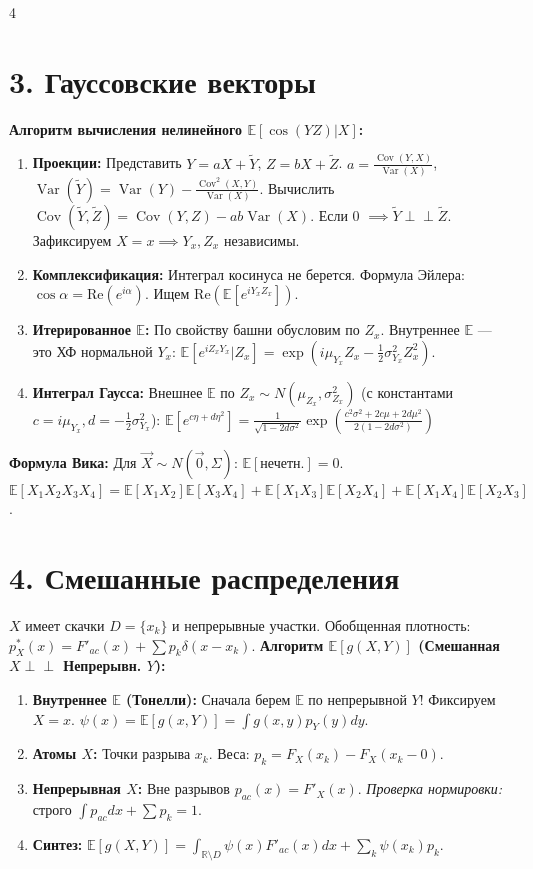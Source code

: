 \documentclass[8pt, a4paper, landscape]{extarticle}
\newcommand{\E}{\mathbb{E}}
\DeclareMathOperator{\Var}{Var}
\DeclareMathOperator{\Cov}{Cov}
\begin{document}
\begin{multicols*}{4}
\section*{3. Гауссовские векторы}
\textbf{Алгоритм вычисления нелинейного $\E[\cos(YZ)|X]$:}
\begin{enumerate}
    \item \textbf{Проекции:} Представить $Y = aX+\tilde{Y}$, $Z=bX+\tilde{Z}$.
    $a \!=\! \frac{\Cov(Y,X)}{\Var(X)}$, $\Var(\tilde{Y}) \!=\! \Var(Y) - \frac{\Cov^2(X,Y)}{\Var(X)}$.
    Вычислить $\Cov(\tilde{Y},\tilde{Z}) \!=\! \Cov(Y,Z) - ab\Var(X)$. Если 0 $\implies \tilde{Y} \perp\!\!\perp \tilde{Z}$. Зафиксируем $X=x \implies Y_x, Z_x$ независимы.
    \item \textbf{Комплексификация:} Интеграл косинуса не берется. Формула Эйлера: $\cos \alpha = \text{Re}(e^{i\alpha})$. Ищем $\text{Re}(\E[e^{iY_x Z_x}])$.
    \item \textbf{Итерированное $\E$:} По свойству башни обусловим по $Z_x$. Внутреннее $\E$ --- это ХФ нормальной $Y_x$:
    $\E[e^{i Z_x Y_x}|Z_x] = \exp(i\mu_{Y_x} Z_x - \frac{1}{2}\sigma_{Y_x}^2 Z_x^2)$.
    \item \textbf{Интеграл Гаусса:} Внешнее $\E$ по $Z_x \sim N(\mu_{Z_x}, \sigma_{Z_x}^2)$ (с константами $c=i\mu_{Y_x}, d=-\frac{1}{2}\sigma_{Y_x}^2$):
    $ \E[e^{c\eta + d\eta^2}] = \frac{1}{\sqrt{1-2d\sigma^2}}\exp\left( \frac{c^2\sigma^2+2c\mu+2d\mu^2}{2(1-2d\sigma^2)} \right) $
\end{enumerate}

\textbf{Формула Вика:} Для $\vec{X} \sim N(\vec{0}, \Sigma)$: $\E[\text{нечетн.}]=0$.
$\E[X_1 X_2 X_3 X_4] = \E[X_1 X_2]\E[X_3 X_4] + \E[X_1 X_3]\E[X_2 X_4] + \E[X_1 X_4]\E[X_2 X_3]$.

\section*{4. Смешанные распределения}
$X$ имеет скачки $D=\{x_k\}$ и непрерывные участки. Обобщенная плотность: $p_X^*(x) = F'_{ac}(x) + \sum p_k \delta(x-x_k)$.
\textbf{Алгоритм $\E[g(X,Y)]$ (Смешанная $X \perp\!\!\perp$ Непрерывн. $Y$):}
\begin{enumerate}
    \item \textbf{Внутреннее $\E$ (Тонелли):} Сначала берем $\E$ по непрерывной $Y$! Фиксируем $X=x$. $\psi(x) = \E[g(x,Y)] = \int g(x,y)p_Y(y)dy$.
    \item \textbf{Атомы $X$:} Точки разрыва $x_k$. Веса: $p_k = F_X(x_k) - F_X(x_k-0)$.
    \item \textbf{Непрерывная $X$:} Вне разрывов $p_{ac}(x) = F'_X(x)$. \textit{Проверка нормировки:} строго $\int p_{ac}dx + \sum p_k = 1$.
    \item \textbf{Синтез:} $\E[g(X,Y)] = \int_{\mathbb{R}\setminus D} \psi(x) F'_{ac}(x) dx + \sum_{k} \psi(x_k) p_k$.
\end{enumerate}


\end{multicols*}
\end{document}
